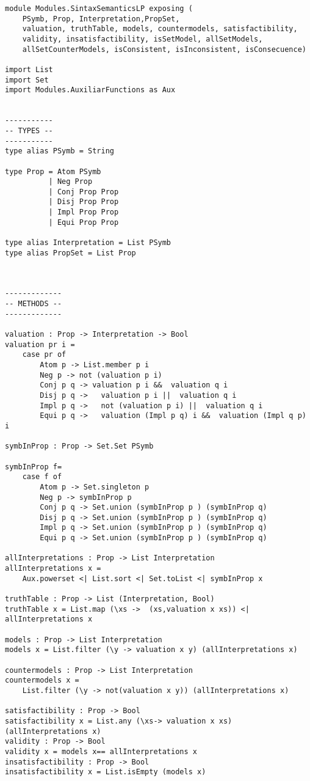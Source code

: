 \documentclass[a4paper]{report}
\begin{document}
\begin{lstlisting}[caption={Módulo SintaxSemanticsLP}]
module Modules.SintaxSemanticsLP exposing (
    PSymb, Prop, Interpretation,PropSet,
    valuation, truthTable, models, countermodels, satisfactibility, 
    validity, insatisfactibility, isSetModel, allSetModels, 
    allSetCounterModels, isConsistent, isInconsistent, isConsecuence)

import List
import Set
import Modules.AuxiliarFunctions as Aux 


-----------
-- TYPES --
-----------
type alias PSymb = String 

type Prop = Atom PSymb
          | Neg Prop
          | Conj Prop Prop
          | Disj Prop Prop
          | Impl Prop Prop
          | Equi Prop Prop

type alias Interpretation = List PSymb
type alias PropSet = List Prop



-------------
-- METHODS --
-------------

valuation : Prop -> Interpretation -> Bool
valuation pr i =
    case pr of
        Atom p -> List.member p i
        Neg p -> not (valuation p i)
        Conj p q -> valuation p i &&  valuation q i
        Disj p q ->   valuation p i ||  valuation q i
        Impl p q ->   not (valuation p i) ||  valuation q i
        Equi p q ->   valuation (Impl p q) i &&  valuation (Impl q p) i

symbInProp : Prop -> Set.Set PSymb

symbInProp f=
    case f of
        Atom p -> Set.singleton p
        Neg p -> symbInProp p
        Conj p q -> Set.union (symbInProp p ) (symbInProp q)
        Disj p q -> Set.union (symbInProp p ) (symbInProp q)
        Impl p q -> Set.union (symbInProp p ) (symbInProp q)
        Equi p q -> Set.union (symbInProp p ) (symbInProp q)

allInterpretations : Prop -> List Interpretation
allInterpretations x =  
    Aux.powerset <| List.sort <| Set.toList <| symbInProp x

truthTable : Prop -> List (Interpretation, Bool)
truthTable x = List.map (\xs ->  (xs,valuation x xs)) <| allInterpretations x

models : Prop -> List Interpretation
models x = List.filter (\y -> valuation x y) (allInterpretations x)

countermodels : Prop -> List Interpretation
countermodels x =
    List.filter (\y -> not(valuation x y)) (allInterpretations x)

satisfactibility : Prop -> Bool
satisfactibility x = List.any (\xs-> valuation x xs) (allInterpretations x)
validity : Prop -> Bool
validity x = models x== allInterpretations x
insatisfactibility : Prop -> Bool
insatisfactibility x = List.isEmpty (models x)


\end{lstlisting}
\end{document}
